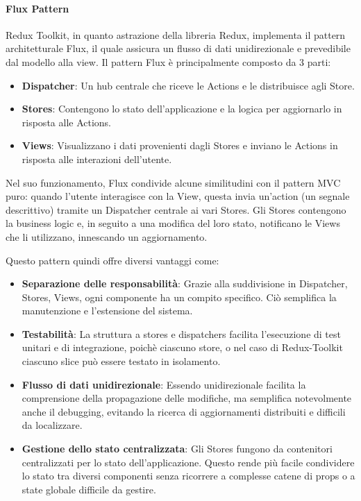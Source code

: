 \paragraph{Flux Pattern}
Redux Toolkit, in quanto astrazione della libreria Redux, implementa il pattern architetturale Flux,
il quale assicura un flusso di dati unidirezionale e prevedibile dal modello alla view.
Il pattern Flux è principalmente composto da 3 parti:
\begin{itemize}
      \item \textbf{Dispatcher}: Un hub centrale che riceve le Actions e le distribuisce agli Store.
      \item \textbf{Stores}:  Contengono lo stato dell'applicazione e la logica per aggiornarlo in risposta alle Actions.
      \item \textbf{Views}: Visualizzano i dati provenienti dagli Stores e inviano le Actions in risposta alle interazioni dell'utente.
\end{itemize}
Nel suo funzionamento, Flux condivide alcune similitudini con il pattern MVC puro:
quando l'utente interagisce con la View, questa invia un'action (un segnale descrittivo) tramite un Dispatcher centrale ai vari Stores.
Gli Stores contengono la business logic e, in seguito a una modifica del loro stato, notificano le Views che li utilizzano, innescando un aggiornamento.

Questo pattern quindi offre diversi vantaggi come:
\begin{itemize}
      \item \textbf{Separazione delle responsabilità}: Grazie alla suddivisione in Dispatcher, Stores, Views,
      ogni componente ha un compito specifico. Ciò semplifica la manutenzione e l’estensione del sistema.
      \item \textbf{Testabilità}: La struttura a stores e dispatchers facilita l’esecuzione di test unitari e di integrazione, poichè
      ciascuno store, o nel caso di Redux-Toolkit ciascuno slice può essere testato in isolamento.
      \item \textbf{Flusso di dati unidirezionale}: Essendo unidirezionale facilita la comprensione della propagazione delle modifiche,
       ma semplifica notevolmente anche il debugging, evitando la ricerca di aggiornamenti distribuiti e difficili da localizzare.
      \item \textbf{Gestione dello stato centralizzata}: Gli Stores fungono da contenitori centralizzati per lo stato dell'applicazione. 
      Questo rende più facile condividere lo stato tra diversi componenti senza ricorrere a complesse catene di props o a state globale difficile da gestire.
\end{itemize}


